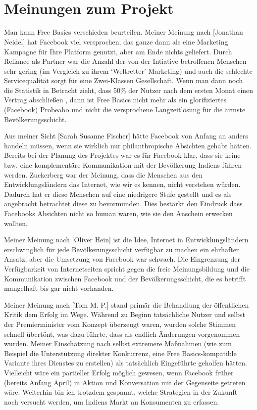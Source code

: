 \documentclass{article}
\begin{document}
\break
\appendix
\section{\\Meinungen zum Projekt}

Man kann Free Basics verschieden beurteilen. Meiner Meinung nach [Jonathan Neidel] hat Facebook viel versprochen, das ganze dann als eine Marketing Kampagne für Ihre Platform genutzt, aber am Ende nichts geliefert. Durch Reliance als Partner war die Anzahl der von der Intiative betroffenen Menschen sehr gering (im Vergleich zu ihrem `Weltretter' Marketing) und auch die schlechte Servicequalität sorgt für eine Zwei-Klassen Gesellschaft. Wenn man dann noch die Statistik in Betracht zieht, dass 50\% der Nutzer nach dem ersten Monat einen Vertrag abschließen \parencite{everydayLife}, dann ist Free Basics nicht mehr als ein glorifiziertes (Facebook) Probeabo und nicht die versprochene Langzeitlösung für die ärmste Bevölkerungsschicht.

\medskip

Aus meiner Sicht [Sarah Susanne Fischer] hätte Facebook von Anfang an anders handeln müssen, wenn sie wirklich nur philanthropische Absichten gehabt hätten. Bereits bei der Planung des Projektes war es für Facebook klar, dass sie keine bzw. eine komplementäre Kommunikation mit der Bevölkerung Indiens führen werden. Zuckerberg war der Meinung, dass die Menschen aus den Entwicklungsländern das Internet, wie wir es kennen, nicht verstehen würden. Dadurch hat er diese Menschen auf eine niedrigere Stufe gestellt und es als angebracht betrachtet diese zu bevormunden. 
Dies bestärkt den Eindruck dass Facebooks Absichten nicht so human waren, wie sie den Anschein erwecken wollten.

\medskip

Meiner Meinung nach [Oliver Hein] ist die Idee, Internet in Entwicklungsländern erschwinglich für jede Bevölkerungsschicht verfügbar zu machen ein ehrhafter Ansatz, aber die Umsetzung von Facebook war schwach. Die Eingrenzung der Verfügbarkeit von Internetseiten spricht gegen die freie Meinungsbildung und die Kommunikation zwischen Facebook und der Bevölkerungsschicht, die es betrifft mangelhaft bis gar nicht vorhanden.

\medskip

Meiner Meinung nach [Tom M. P.] stand primär die Behandlung der öffentlichen Kritik dem Erfolg im Wege.
Während zu Beginn tatsächliche Nutzer und selbst der Premierminister vom Konzept überzeugt waren, wurden solche Stimmen schnell übertönt, was dazu führte, dass als endlich Änderungen vorgenommen wurden.
Meiner Einschätzung nach selbst extremere Maßnahmen (wie zum Beispiel die Unterstützung direkter Konkurrenz, eine Free Basics-kompatible Variante ihres Dienstes zu erstellen) als tatsächlich Eingeführte geholfen hätten.
Vielleicht wäre ein partieller Erfolg möglich gewesen, wenn Facebook früher (bereits Anfang April) in Aktion und Konversation mit der Gegenseite getreten wäre.
Weiterhin bin ich trotzdem gespannt, welche Strategien in der Zukunft noch versucht werden, um Indiens Markt an Konsumenten zu erfassen.

\break
\printbibliography
\end{document}
